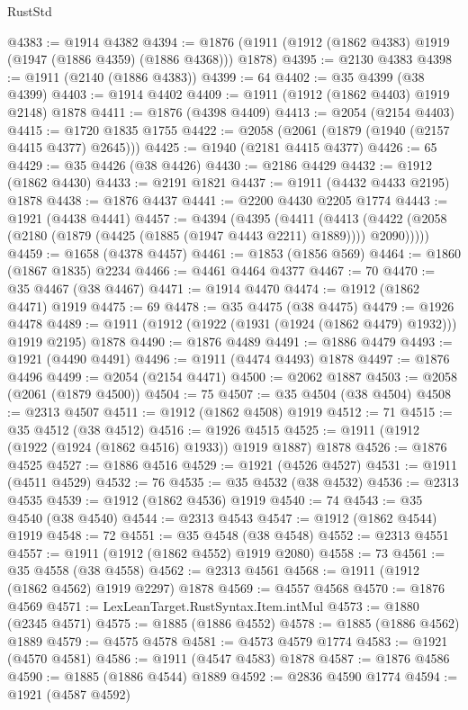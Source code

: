 \begin{lexlean}{RustStd}
\begin{coremodule}
{\begin{coremodule}
{{{{{{{{{{{{{{{{{{{{{{{{{{{{{@4383 := @1914 @4382
@4394 := @1876 (@1911 (@1912 (@1862 @4383) @1919 (@1947 (@1886 @4359) (@1886 @4368))) @1878)
@4395 := @2130 @4383
@4398 := @1911 (@2140 (@1886 @4383))
@4399 := 64
@4402 := @35 @4399 (@38 @4399)
@4403 := @1914 @4402
@4409 := @1911 (@1912 (@1862 @4403) @1919 @2148) @1878
@4411 := @1876 (@4398 @4409)
@4413 := @2054 (@2154 @4403)
@4415 := @1720 @1835 @1755
@4422 := @2058 (@2061 (@1879 (@1940 (@2157 @4415 @4377) @2645)))
@4425 := @1940 (@2181 @4415 @4377)
@4426 := 65
@4429 := @35 @4426 (@38 @4426)
@4430 := @2186 @4429
@4432 := @1912 (@1862 @4430)
@4433 := @2191 @1821
@4437 := @1911 (@4432 @4433 @2195) @1878
@4438 := @1876 @4437
@4441 := @2200 @4430 @2205 @1774
@4443 := @1921 (@4438 @4441)
@4457 := @4394
    (@4395
      (@4411
        (@4413 (@4422 (@2058 (@2180 (@1879 (@4425 (@1885 (@1947 @4443 @2211) @1889)))) @2090)))))
@4459 := @1658 (@4378 @4457)
@4461 := @1853 (@1856 @569)
@4464 := @1860 (@1867 @1835) @2234
@4466 := @4461 @4464 @4377
@4467 := 70
@4470 := @35 @4467 (@38 @4467)
@4471 := @1914 @4470
@4474 := @1912 (@1862 @4471) @1919
@4475 := 69
@4478 := @35 @4475 (@38 @4475)
@4479 := @1926 @4478
@4489 := @1911 (@1912 (@1922 (@1931 (@1924 (@1862 @4479) @1932))) @1919 @2195) @1878
@4490 := @1876 @4489
@4491 := @1886 @4479
@4493 := @1921 (@4490 @4491)
@4496 := @1911 (@4474 @4493) @1878
@4497 := @1876 @4496
@4499 := @2054 (@2154 @4471)
@4500 := @2062 @1887
@4503 := @2058 (@2061 (@1879 @4500))
@4504 := 75
@4507 := @35 @4504 (@38 @4504)
@4508 := @2313 @4507
@4511 := @1912 (@1862 @4508) @1919
@4512 := 71
@4515 := @35 @4512 (@38 @4512)
@4516 := @1926 @4515
@4525 := @1911 (@1912 (@1922 (@1924 (@1862 @4516) @1933)) @1919 @1887) @1878
@4526 := @1876 @4525
@4527 := @1886 @4516
@4529 := @1921 (@4526 @4527)
@4531 := @1911 (@4511 @4529)
@4532 := 76
@4535 := @35 @4532 (@38 @4532)
@4536 := @2313 @4535
@4539 := @1912 (@1862 @4536) @1919
@4540 := 74
@4543 := @35 @4540 (@38 @4540)
@4544 := @2313 @4543
@4547 := @1912 (@1862 @4544) @1919
@4548 := 72
@4551 := @35 @4548 (@38 @4548)
@4552 := @2313 @4551
@4557 := @1911 (@1912 (@1862 @4552) @1919 @2080)
@4558 := 73
@4561 := @35 @4558 (@38 @4558)
@4562 := @2313 @4561
@4568 := @1911 (@1912 (@1862 @4562) @1919 @2297) @1878
@4569 := @4557 @4568
@4570 := @1876 @4569
@4571 := LexLeanTarget.RustSyntax.Item.intMul
@4573 := @1880 (@2345 @4571)
@4575 := @1885 (@1886 @4552)
@4578 := @1885 (@1886 @4562) @1889
@4579 := @4575 @4578
@4581 := @4573 @4579 @1774
@4583 := @1921 (@4570 @4581)
@4586 := @1911 (@4547 @4583) @1878
@4587 := @1876 @4586
@4590 := @1885 (@1886 @4544) @1889
@4592 := @2836 @4590 @1774
@4594 := @1921 (@4587 @4592)
}}}}}}}}}}}}}}}}}}}}}}}}}}}}}
\end{coremodule}}
\end{coremodule}
\end{lexlean}
